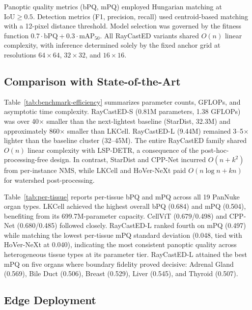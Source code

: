 \documentclass[conference]{IEEEtran}
\begin{document}
Panoptic quality metrics (bPQ, mPQ) employed Hungarian matching at $\text{IoU} \geq 0.5$. Detection metrics (F1, precision, recall) used centroid-based matching with a 12-pixel distance threshold. Model selection was governed by the fitness function $0.7 \cdot \text{bPQ} + 0.3 \cdot \text{mAP}_{50}$. All RayCastED variants shared $O(n)$ linear complexity, with inference determined solely by the fixed anchor grid at resolutions $64 \times 64$, $32 \times 32$, and $16 \times 16$.

\subsection{Comparison with State-of-the-Art}



Table~\ref{tab:benchmark-efficiency} summarizes parameter counts, GFLOPs, and asymptotic time complexity. RayCastED-S (0.81M parameters, 1.38 GFLOPs) was over 40$\times$ smaller than the next-lightest baseline (StarDist, 32.3M) and approximately 860$\times$ smaller than LKCell. RayCastED-L (9.44M) remained 3--5$\times$ lighter than the baseline cluster (32--45M). The entire RayCastED family shared $O(n)$ linear complexity with LSP-DETR, a consequence of the post-hoc-processing-free design. In contrast, StarDist and CPP-Net incurred $O(n + k^2)$ from per-instance NMS, while LKCell and HoVer-NeXt paid $O(n \log n + kn)$ for watershed post-processing.



Table~\ref{tab:per-tissue} reports per-tissue bPQ and mPQ across all 19 PanNuke organ types. LKCell achieved the highest overall bPQ (0.684) and mPQ (0.504), benefiting from its 699.7M-parameter capacity. CellViT (0.679/0.498) and CPP-Net (0.680/0.485) followed closely. RayCastED-L ranked fourth on mPQ (0.497) while matching the lowest per-tissue mPQ standard deviation (0.048, tied with HoVer-NeXt at 0.040), indicating the most consistent panoptic quality across heterogeneous tissue types at its parameter tier. RayCastED-L attained the best mPQ on five organs where boundary fidelity proved decisive: Adrenal Gland (0.569), Bile Duct (0.506), Breast (0.529), Liver (0.545), and Thyroid (0.507).

\subsection{Edge Deployment}


\end{document}
